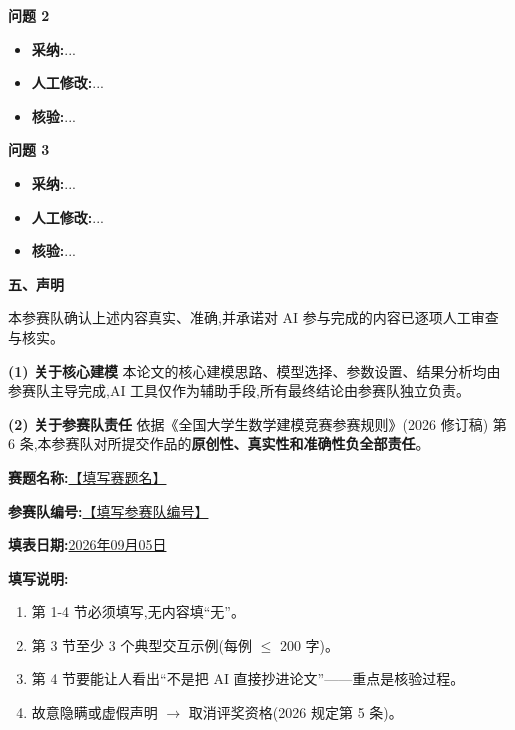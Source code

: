 \documentclass[a4paper,12pt]{article}
\newcommand{\song}{\CJKfamily{song}}
\begin{document}
\vspace{0.5em}
\noindent\textbf{问题 2}
\begin{itemize}[itemindent=2em]
  \item \textbf{采纳:}...
  \item \textbf{人工修改:}...
  \item \textbf{核验:}...
\end{itemize}

\vspace{0.5em}
\noindent\textbf{问题 3}
\begin{itemize}[itemindent=2em]
  \item \textbf{采纳:}...
  \item \textbf{人工修改:}...
  \item \textbf{核验:}...
\end{itemize}

\noindent\textbf{五、声明}

{\song 本参赛队确认上述内容真实、准确,并承诺对 AI 参与完成的内容已逐项人工审查与核实。}

\vspace{0.5em}

\noindent\textbf{(1) 关于核心建模} \quad 本论文的核心建模思路、模型选择、参数设置、结果分析均由参赛队主导完成,AI 工具仅作为辅助手段,所有最终结论由参赛队独立负责。

\vspace{0.4em}

\noindent\textbf{(2) 关于参赛队责任} \quad 依据《全国大学生数学建模竞赛参赛规则》(2026 修订稿) 第 6 条,本参赛队对所提交作品的\textbf{原创性、真实性和准确性负全部责任}。

\vspace{2em}

\noindent\textbf{赛题名称:}\underline{\hspace{6em}【填写赛题名】\hspace{6em}}

\noindent\textbf{参赛队编号:}\underline{\hspace{6em}【填写参赛队编号】\hspace{6em}}

\noindent\textbf{填表日期:}\underline{\hspace{2em}2026\hspace{2em}年\hspace{2em}09\hspace{2em}月\hspace{2em}05\hspace{2em}日}

\vspace{1em}

\noindent\textbf{填写说明:}
\begin{enumerate}[itemindent=2em]
  \item 第 1-4 节必须填写,无内容填``无''。
  \item 第 3 节至少 3 个典型交互示例(每例 $\le$ 200 字)。
  \item 第 4 节要能让人看出``不是把 AI 直接抄进论文''——重点是核验过程。
  \item 故意隐瞒或虚假声明 $\rightarrow$ 取消评奖资格(2026 规定第 5 条)。
\end{enumerate}
\end{document}
